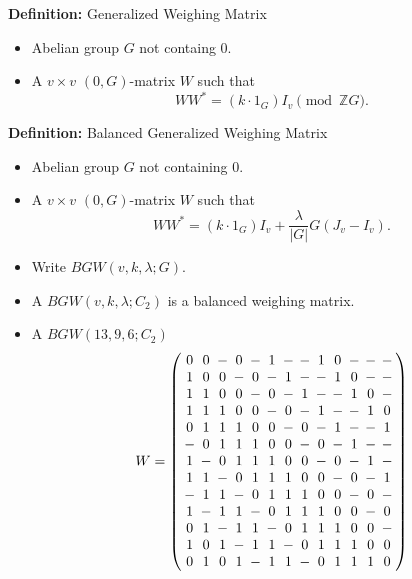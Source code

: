 \documentclass{beamer}
\newcommand{\abs}[1]{|#1|}
\begin{document}
\begin{frame}

  \begin{block}{{\bf Definition:} Generalized Weighing Matrix}
    \begin{itemize}
    \item Abelian group $G$ not containg $0$.
    \item A $v \times v$ $(0,G)$-matrix $W$ such that
      \[
        WW^* = (k \cdot 1_G)I_v \pmod{\mathbb{Z}G}.
      \]
    \end{itemize}
  \end{block}

  \begin{block}{{\bf Definition:} Balanced Generalized Weighing Matrix}
    \begin{itemize}
    \item Abelian group $G$ not containing $0$.
    \item A $v \times v$ $(0,G)$-matrix $W$ such that
      \[
        WW^* = (k \cdot 1_G)I_v + \frac{\lambda}{\abs{G}}G(J_v-I_v).
      \]
    \item Write $BGW(v,k,\lambda; G)$.
    \end{itemize}
  \end{block}

  \begin{itemize}
  \item A $BGW(v,k,\lambda;C_2)$ is a balanced weighing matrix.
  \end{itemize}
  
\end{frame}

\begin{frame}

  \begin{itemize}
  \item A $BGW(13,9,6;C_2)$
    \[
      W =
      \arraycolsep=2.0pt\def\arraystretch{1.0}
      \left(
        \begin{array}{ccccccccccccc}
          0&0&-&0&-&1&-&-&1&0&-&-&-\\
          1&0&0&-&0&-&1&-&-&1&0&-&-\\
          1&1&0&0&-&0&-&1&-&-&1&0&-\\
          1&1&1&0&0&-&0&-&1&-&-&1&0\\
          0&1&1&1&0&0&-&0&-&1&-&-&1\\
          -&0&1&1&1&0&0&-&0&-&1&-&-\\
          1&-&0&1&1&1&0&0&-&0&-&1&-\\
          1&1&-&0&1&1&1&0&0&-&0&-&1\\
          -&1&1&-&0&1&1&1&0&0&-&0&-\\
          1&-&1&1&-&0&1&1&1&0&0&-&0\\
          0&1&-&1&1&-&0&1&1&1&0&0&-\\
          1&0&1&-&1&1&-&0&1&1&1&0&0\\
          0&1&0&1&-&1&1&-&0&1&1&1&0\\
        \end{array}
      \right)
    \]
  \end{itemize}
  
\end{frame}
\end{document}

